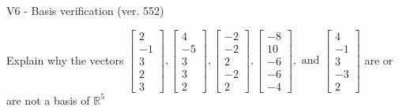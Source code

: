 \begin{exercise}
  \begin{exerciseTitle}V6 - Basis verification (ver. 552)\end{exerciseTitle}
  \begin{exerciseStatement}
    Explain why the vectors \(\left[\begin{array}{r}
2 \\
-1 \\
3 \\
2 \\
3
\end{array}\right] , \left[\begin{array}{r}
4 \\
-5 \\
3 \\
3 \\
2
\end{array}\right] , \left[\begin{array}{r}
-2 \\
-2 \\
2 \\
-2 \\
2
\end{array}\right] , \left[\begin{array}{r}
-8 \\
10 \\
-6 \\
-6 \\
-4
\end{array}\right] , \text{ and } \left[\begin{array}{r}
4 \\
-1 \\
3 \\
-3 \\
2
\end{array}\right]\) are or are not a basis of \(\mathbb{R}^5\)	



\end{exerciseStatement}
\end{exercise}
